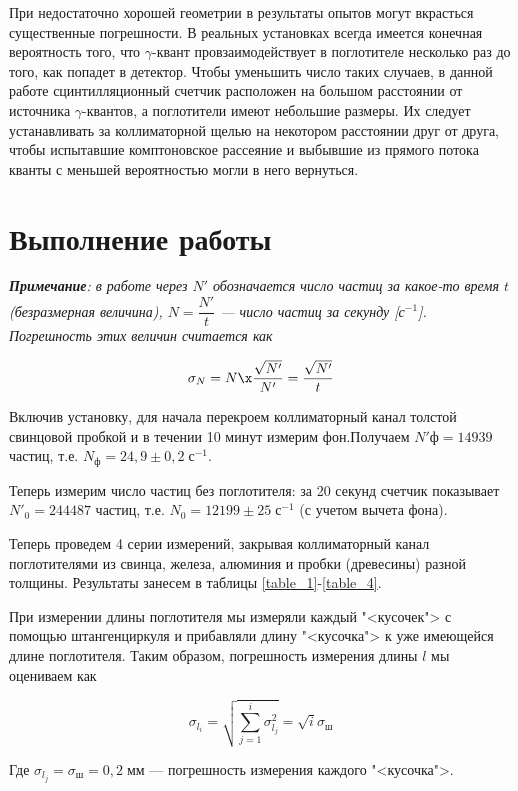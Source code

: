 \documentclass[12pt]{kiarticle} %
\newcommand{\ga}{\ensuremath{\gamma}}
\begin{document}
При недостаточно хорошей геометрии в результаты опытов могут
вкрасться существенные погрешности. В реальных установках всегда имеется конечная вероятность того, что \ga-квант провзаимодействует в
поглотителе несколько раз до того, как попадет в детектор. Чтобы уменьшить число таких случаев, в данной работе сцинтилляционный счетчик расположен на большом расстоянии от источника \ga-квантов, а поглотители имеют небольшие
размеры. Их следует устанавливать за коллиматорной щелью на некотором расстоянии друг от друга, чтобы испытавшие комптоновское
рассеяние и выбывшие из прямого потока кванты с меньшей вероятностью могли в него вернуться.

\section{Выполнение работы}

 \textit{\textbf{Примечание}: в работе через $ N' $ обозначается число частиц за какое-то время $ t $ (безразмерная величина), $ N = \dfrac{N'}{t} $ --- число частиц за секунду [с$ ^{-1} $]. Погрешность этих величин считается как} 
 
 \begin{equation}\label{}
 \sigma_N = N \x \dfrac{\sqrt{N'}}{N'} = \dfrac{\sqrt{N'}}{t}
 \end{equation}

Включив установку, для начала перекроем коллиматорный канал толстой свинцовой пробкой и в течении 10 минут измерим фон.Получаем $ N'ф = 14939 $ частиц, т.е. $ N_ф = 24,9 \pm 0,2 \; с^{-1} $.

Теперь измерим число частиц без поглотителя: за 20 секунд счетчик показывает $ N'_0 = 244487 $ частиц, т.е. $ N_0 = 12199 \pm 25 \; с^{-1}$ (с учетом вычета фона). 

Теперь проведем 4 серии измерений, закрывая коллиматорный канал поглотителями из свинца, железа, алюминия и пробки (древесины) разной толщины. Результаты занесем в таблицы \ref{table_1}-\ref{table_4}. 

При измерении длины поглотителя мы измеряли каждый "<кусочек"> с помощью штангенциркуля и прибавляли длину "<кусочка"> к уже имеющейся длине поглотителя. Таким образом,  погрешность измерения длины $ l $ мы оцениваем как

\begin{equation}\label{}
\sigma_{l_i} = \sqrt{\sum\limits_{j=1}^i \sigma_{l_j}^2} = \sqrt{i}\sigma_ш
\end{equation}

Где $ \sigma_{l_j} = \sigma_ш = 0,2 \;мм $ --- погрешность измерения каждого "<кусочка">. 
\end{document}
